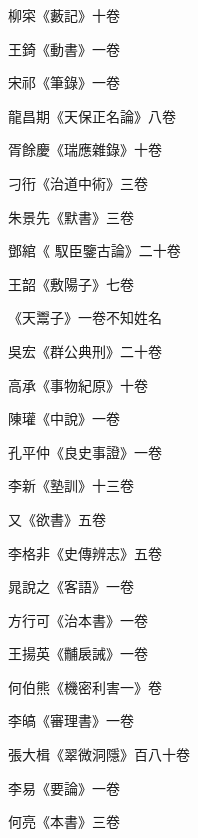 \begin{pinyinscope}
 柳寀《藪記》十卷



 王錡《動書》一卷



 宋祁《筆錄》一卷



 龍昌期《天保正名論》八卷



 胥餘慶《瑞應雜錄》十卷



 刁衎《治道中術》三卷



 朱景先《默書》三卷



 鄧綰《
 馭臣鑒古論》二十卷



 王韶《敷陽子》七卷



 《天鬻子》一卷不知姓名



 吳宏《群公典刑》二十卷



 高承《事物紀原》十卷



 陳瓘《中說》一卷



 孔平仲《良史事證》一卷



 李新《塾訓》十三卷



 又《欲書》五卷



 李格非《史傳辨志》五卷



 晁說之《客語》一卷



 方行可《治本書》一卷



 王揚英《黼扆誡》一卷



 何伯熊《機密利害一》卷



 李皜《審理書》一卷



 張大楫《翠微洞隱》百八十卷



 李易《要論》一卷



 何亮《本書》三卷




\end{pinyinscope}
